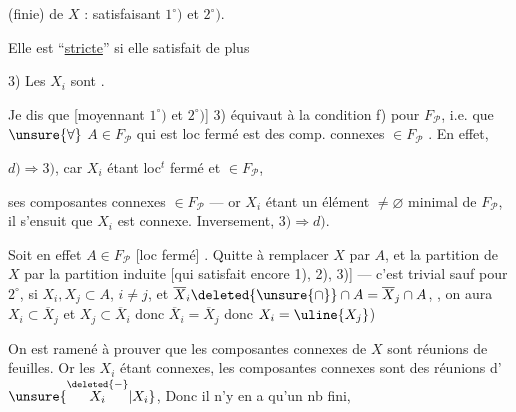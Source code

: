 

  (finie) de $X$ : satisfaisant $1^\circ)$ et $2^\circ)$.

Elle est ``\uline{stricte}'' si elle satisfait de plus

3) Les $X_i$ sont .

Je dis que [moyennant $1^\circ)$ et $2^\circ)$] 3) équivaut à la condition f) pour $F_{\mathcal P}$, i.e. que $\unsure{\forall}$ $A\in F_{\mathcal P}$ qui est loc fermé est   des comp. connexes $\in F_{\mathcal P}$  . En effet,

$d)\Longrightarrow3)$, car $X_i$ étant loc$^t$ fermé et $\in F_{\mathcal P}$, 



 ses composantes connexes  $\in F_{\mathcal P}$ --- or $X_i$ étant un élément $\ne\varnothing$ minimal de $F_{\mathcal P}$, il s'ensuit que $X_i$ est connexe. Inversement, $3)\Longrightarrow d)$.

Soit en effet $A\in F_{\mathcal P}$ [loc fermé] . Quitte à remplacer $X$ par $A$, et la partition de $X$ par la partition induite [qui satisfait encore 1), 2), 3)] ---  c'est trivial sauf pour $2^\circ$,   si $X_i,X_j\subset A$, $i\ne j$, et $\overline X_i\deleted{\unsure{\cap}}\cap A=\overline X_j\cap A$, , on aura $X_i\subset\overline X_j$ et $X_j\subset\overline X_i$ donc $\overline X_i=\overline X_j$ donc $X_i=\uline{X_j}$)

On est ramené à prouver  que les composantes connexes  de $X$ sont  réunions de feuilles. Or les $X_i$ étant connexes,   les composantes connexes  sont  des réunions d' $\unsure{\overset{\deleted{-}}{X_i}|X_i}$,  Donc il n'y en a qu'un nb fini, 

